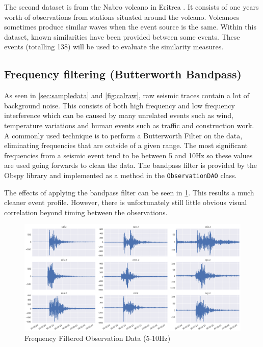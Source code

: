 \documentclass[../report.tex]{subfiles}
\begin{document}
	The second dataset is from the Nabro volcano in Eritrea \citep{eritrea1}.  It consists of one years worth of observations from stations situated around the volcano.  Volcanoes sometimes produce similar waves when the event source is the same.  Within this dataset, known similarities have been provided between some events.  These events (totalling 138) will be used to evaluate the similarity measures.

\subsection{Frequency filtering (Butterworth Bandpass)}
	As seen in \cref{sec:sampledata} and \cref{fig:calraw}, raw seismic traces contain a lot of background noise.  This consists of both high frequency and low frequency interference which can be caused by many unrelated events such as wind, temperature variations and human events such as traffic and construction work.  A commonly used technique \citep{man-seis-obs} is to perform a Butterworth Filter \citep{bandpass} on the data, eliminating frequencies that are outside of a given range.  The most significant frequencies from a seismic event tend to be between 5 and 10Hz so these values are used going forwards to clean the data.  The bandpass filter is provided by the Obspy library and implemented as a method in the \verb|ObservationDAO| class.
	
	The effects of applying the bandpass filter can be seen in \cref{fig:calbandpass}.  This results a much cleaner event profile.  However, there is unfortunately still little obvious visual correlation beyond timing between the observations.

\begin{figure}[H]
	\centering
	\includegraphics[width=1\linewidth]{img/cal_bandpass}
	\caption{Frequency Filtered Observation Data (5-10Hz)}
	\label{fig:calbandpass}
\end{figure}
\end{document}
